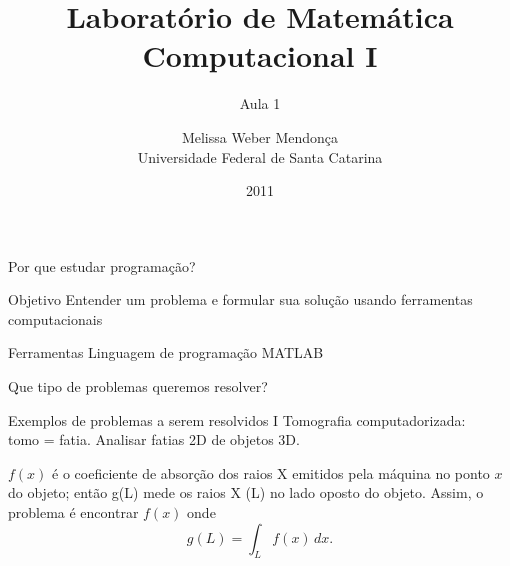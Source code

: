\documentclass[hyperref={pdfpagelabels=false}]{beamer}
\title{Laboratório de Matemática Computacional I}
\subtitle{Aula 1}
\author[M. Weber Mendonça]{Melissa Weber Mendonça\\
Universidade Federal de Santa Catarina}
\date{2011}
\begin{document}
\setmonofont{Inconsolata}

\begin{frame}
  \titlepage
\end{frame}

\begin{frame}{Por que estudar programação?}
	\begin{block}{Objetivo}
		Entender um problema e formular sua solução usando ferramentas computacionais
	\end{block}
	\begin{block}{Ferramentas}
		Linguagem de programação MATLAB
	\end{block}
  \vfill
	\begin{center}
		\alert{Que tipo de problemas queremos resolver?}
	\end{center}
\end{frame}

\begin{frame}{Exemplos de problemas a serem resolvidos I}
  Tomografia computadorizada: \\
  
  tomo = fatia. Analisar fatias 2D de objetos 3D.
  
  $f(x)$ é o coeficiente de absorção dos raios X emitidos pela máquina no ponto $x$ do objeto; então g(L) mede os raios X (L) no lado oposto do objeto. Assim, o problema é encontrar $f(x)$ onde 
  \begin{equation*}
    g(L) = \int_L \! f(x) \, dx.
  \end{equation*}
	\begin{columns}
	\end{columns}
\end{frame}
\end{document}
